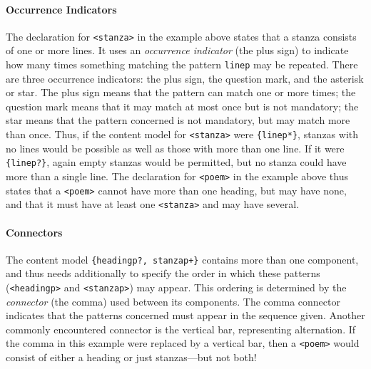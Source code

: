 \paragraph[{Occurrence Indicators}]{Occurrence Indicators}\label{SG144}\par
The declaration for \texttt{<stanza>} in the example above states that a stanza consists of one or more lines. It uses an \textit{occurrence indicator} (the plus sign) to indicate how many times something matching the pattern \texttt{line\textunderscore p} may be repeated. There are three occurrence indicators: the plus sign, the question mark, and the asterisk or star. The plus sign means that the pattern can match one or more times; the question mark means that it may match at most once but is not mandatory; the star means that the pattern concerned is not mandatory, but may match more than once. Thus, if the content model for \texttt{<stanza>} were \texttt{\{line\textunderscore p*\}}, stanzas with no lines would be possible as well as those with more than one line. If it were \texttt{\{line\textunderscore p?\}}, again empty stanzas would be permitted, but no stanza could have more than a single line. The declaration for \texttt{<poem>} in the example above thus states that a \texttt{<poem>} cannot have more than one heading, but may have none, and that it must have at least one \texttt{<stanza>} and may have several.
\paragraph[{Connectors}]{Connectors}\label{SG145}\par
The content model \texttt{\{heading\textunderscore p?, stanza\textunderscore p+\}} contains more than one component, and thus needs additionally to specify the order in which these patterns (\texttt{<heading\textunderscore p>} and \texttt{<stanza\textunderscore p>}) may appear. This ordering is determined by the \textit{connector} (the comma) used between its components. The comma connector indicates that the patterns concerned must appear in the sequence given. Another commonly encountered connector is the vertical bar, representing alternation. If the comma in this example were replaced by a vertical bar, then a \texttt{<poem>} would consist of either a heading or just stanzas—but not both!
